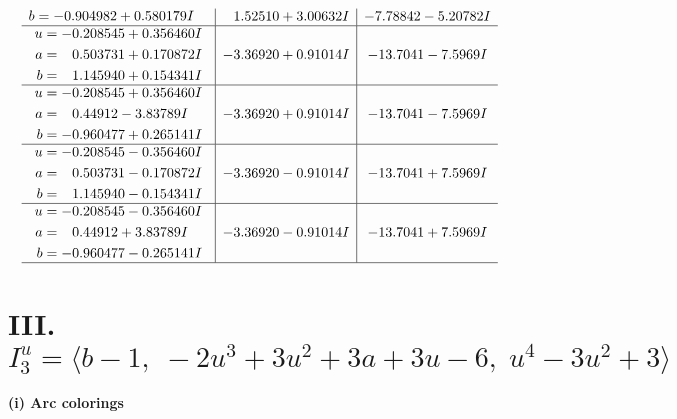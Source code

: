 \documentclass[1p]{elsarticle_modified}
\theoremstyle{definition}
\begin{document}
$$\begin{array}{c|c|c}
\begin{aligned}
b &= -0.904982 + 0.580179 I\end{aligned}
 & \phantom{-}1.52510 + 3.00632 I & -7.78842 - 5.20782 I \\ \hline\begin{aligned}
u &= -0.208545 + 0.356460 I \\
a &= \phantom{-}0.503731 + 0.170872 I \\
b &= \phantom{-}1.145940 + 0.154341 I\end{aligned}
 & -3.36920 + 0.91014 I & -13.7041 - 7.5969 I \\ \hline\begin{aligned}
u &= -0.208545 + 0.356460 I \\
a &= \phantom{-}0.44912 - 3.83789 I \\
b &= -0.960477 + 0.265141 I\end{aligned}
 & -3.36920 + 0.91014 I & -13.7041 - 7.5969 I \\ \hline\begin{aligned}
u &= -0.208545 - 0.356460 I \\
a &= \phantom{-}0.503731 - 0.170872 I \\
b &= \phantom{-}1.145940 - 0.154341 I\end{aligned}
 & -3.36920 - 0.91014 I & -13.7041 + 7.5969 I \\ \hline\begin{aligned}
u &= -0.208545 - 0.356460 I \\
a &= \phantom{-}0.44912 + 3.83789 I \\
b &= -0.960477 - 0.265141 I\end{aligned}
 & -3.36920 - 0.91014 I & -13.7041 + 7.5969 I\\
 \hline 
 \end{array}$$\newpage\newpage\renewcommand{\arraystretch}{1}
\centering \section*{III. $I^u_{3}= \langle b-1,\;-2 u^3+3 u^2+3 a+3 u-6,\;u^4-3 u^2+3 \rangle$}
\flushleft \textbf{(i) Arc colorings}\\
\end{document}
